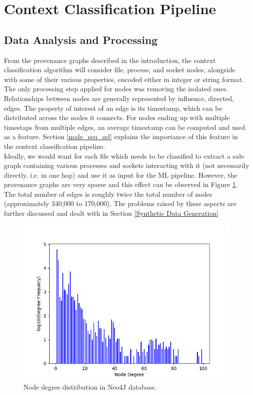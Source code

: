 \section{Context Classification Pipeline}
\subsection{Data Analysis and Processing}

From the provenance graphs described in the introduction, the context classification algorithm will consider file, process, and socket nodes, alongside with some of their various properties, encoded either in integer or string format. The only processing step applied for nodes was removing the isolated ones. Relationships between nodes are generally represented by influence, directed, edges. The property of interest of an edge is its timestamp, which can be distributed across the nodes it connects. For nodes ending up with multiple timestaps from multiple edges, an average timestamp can be computed and used as a feature. Section \ref{node_seq_sel} explains the importance of this feature in the context classification pipeline. \\

Ideally, we would want for each file which needs to be classified to extract a sub-graph containing various processes and sockets interacting with it (not necessarily directly, i.e. in one hop) and use it as input for the ML pipeline. However, the provenance graphs are very sparse and this effect can be observed in Figure \ref{nodedegdist}. The total number of edges is roughly twice the total number of nodes (approximately 340,000 to 170,000). The problems raised by these aspects are further discussed and dealt with in Section \ref{Synthetic Data Generation} 


\begin{figure}[H]
  \centering
  \centerline{\includegraphics[scale = 0.7]{Images/nodedegdist.png}}
  \caption{Node degree distribution in Neo4J database.}
  \label{nodedegdist}
\end{figure}


